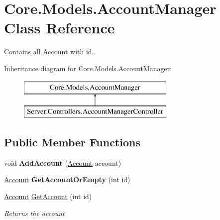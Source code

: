 \hypertarget{classCore_1_1Models_1_1AccountManager}{\section{Core.\-Models.\-Account\-Manager Class Reference}
\label{classCore_1_1Models_1_1AccountManager}
}


Contains all \hyperlink{classCore_1_1Models_1_1Account}{Account} with id.  


Inheritance diagram for Core.\-Models.\-Account\-Manager\-:\begin{figure}[H]
\begin{center}
\leavevmode
\includegraphics[height=2.000000cm]{classCore_1_1Models_1_1AccountManager}
\end{center}
\end{figure}
\subsection*{Public Member Functions}
\begin{DoxyCompactItemize}
\item 
\hypertarget{classCore_1_1Models_1_1AccountManager_a191e85e6daf1d61bf6b0f0318c304875}{void {\bfseries Add\-Account} (\hyperlink{classCore_1_1Models_1_1Account}{Account} account)}\label{classCore_1_1Models_1_1AccountManager_a191e85e6daf1d61bf6b0f0318c304875}

\item 
\hypertarget{classCore_1_1Models_1_1AccountManager_aa34df711aff2cc6588f78e6abc6e9ad2}{\hyperlink{classCore_1_1Models_1_1Account}{Account} {\bfseries Get\-Account\-Or\-Empty} (int id)}\label{classCore_1_1Models_1_1AccountManager_aa34df711aff2cc6588f78e6abc6e9ad2}

\item 
\hyperlink{classCore_1_1Models_1_1Account}{Account} \hyperlink{classCore_1_1Models_1_1AccountManager_a0a85126c3cd1a3ceeb6ceb08f0d817cb}{Get\-Account} (int id)
\begin{DoxyCompactList}\small\item\em Returns the account \end{DoxyCompactList}\end{DoxyCompactItemize}
